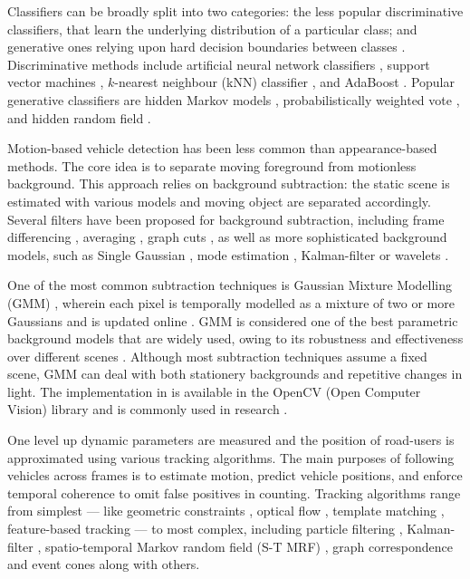 Classifiers can be broadly split into two categories: the less popular discriminative classifiers, that learn the underlying distribution of a particular class; and generative ones relying upon hard decision boundaries between classes \cite{Sivaraman2012}.
Discriminative methods include artificial neural network classifiers \cite{Xia2006}, support vector machines \cite{Cornelis2008}, $k$-nearest neighbour (kNN) classifier \cite{Morris2006}, and AdaBoost \cite{Khammari2005}.
Popular generative classifiers are hidden Markov models \cite{Jazayeri2011}, probabilistically weighted vote \cite{Lin2012}, and hidden random field \cite{Zhang2011}.

Motion-based vehicle detection has been less common than appearance-based methods.
The core idea is to separate moving foreground from motionless background.
This approach relies on background subtraction: the static scene is estimated with various models and moving object are separated accordingly.
Several filters have been proposed for background subtraction, including frame differencing \cite{Park2007}, averaging \cite{Kanhere2008}, graph cuts \cite{Woodford2009}, as well as more sophisticated background models, such as Single Gaussian \cite{Kumar2003}, mode estimation \cite{Zheng2006}, Kalman-filter \cite{Messelodi2005} or wavelets \cite{Gao2009}. 

One of the most common subtraction techniques is Gaussian Mixture Modelling (GMM) \cite{Niknejad2012, Wang2009,Zhang2016a}, wherein each pixel is temporally modelled as a mixture of two or more Gaussians and is updated online \cite{Stauffer1999,Stauffer2000}.
GMM is considered one of the best parametric background models that are widely used, owing to its robustness and effectiveness over different scenes \cite{Zhang2016}.
Although most subtraction techniques assume a fixed scene, GMM can deal with both stationery backgrounds and repetitive changes in light.
The implementation in \cite{Kaewtrakulpong2001} is available in the OpenCV (Open Computer Vision) library and is commonly used in research \cite{OpenCVMog2}.

One level up dynamic parameters are measured and the position of road-users is approximated using various tracking algorithms. 
The main purposes of following vehicles across frames is to estimate  motion, predict vehicle positions, and enforce temporal coherence to omit false positives in counting.
Tracking algorithms range from simplest --- like geometric constraints \cite{Rabe2007}, optical flow \cite{Bhaskar2015}, template matching \cite{Liu2007}, feature-based tracking \cite{Haselhoff2009} --- to most complex, including particle filtering \cite{Danescu2011}, Kalman-filter \cite{Bresson2015}, spatio-temporal Markov random field (S-T MRF) \cite{Zhu2005}, graph correspondence \cite{Lai2010} and event cones \cite{Andrienko2015} along with others. 

